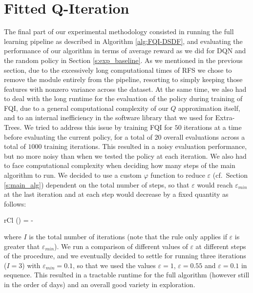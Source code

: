 \section{Fitted Q-Iteration}
The final part of our experimental methodology consisted in running the full
learning pipeline as described in Algorithm \ref{alg:FQI-DSDF}, and evaluating
the performance of our algorithm in terms of average reward as we did for DQN
and the random policy in Section \ref{s:exp_baseline}. 
As we mentioned in the previous section, due to the excessively long 
computational times of RFS we chose to remove the module entirely from the 
pipeline, resorting to simply keeping those features with nonzero variance 
across the dataset. 
At the same time, we also had to deal with the long runtime for the evaluation 
of the policy during training of FQI, due to a general computational complexity 
of our $Q$ approximation itself, and to an internal inefficiency in the 
software library that we used for Extra-Trees.
We tried to address this issue by training FQI for $50$ iterations at a time
before evaluating the current policy, for a total of $20$ overall evaluations
across a total of $1000$ training iterations. 
This resulted in a noisy evaluation performance, but no more noisy than when we
tested the policy at each iteration. 
We also had to face computational complexity when deciding how many steps
of the main algorithm to run. 
We decided to use a custom $\varphi$ function to reduce $\varepsilon$ (cf.\ 
Section \ref{s:main_alg}) dependent on the total number of steps, so that 
$\varepsilon$ would reach $\varepsilon_{min}$ at the last iteration and 
at each step would decrease by a fixed quantity as follows:
%
\begin{IEEEeqnarray}{rCl}
    \varphi(\varepsilon) = \varepsilon - 
\end{IEEEeqnarray}
%
where $I$ is the total number of iterations (note that the rule only 
applies if $\varepsilon$ is greater that $\varepsilon_{min}$). 
We run a comparison of different values of $\varepsilon$ at 
different steps of the procedure, and we eventually decided to settle for 
running three iterations ($I = 3$) with $\varepsilon_{min} = 0.1$, so that we 
used the values $\varepsilon = 1$, $\varepsilon = 0.55$ and 
$\varepsilon = 0.1$ in sequence. 
This resulted in a tractable runtime for the full algorithm (however 
still in the order of days) and an overall good variety in exploration. 

